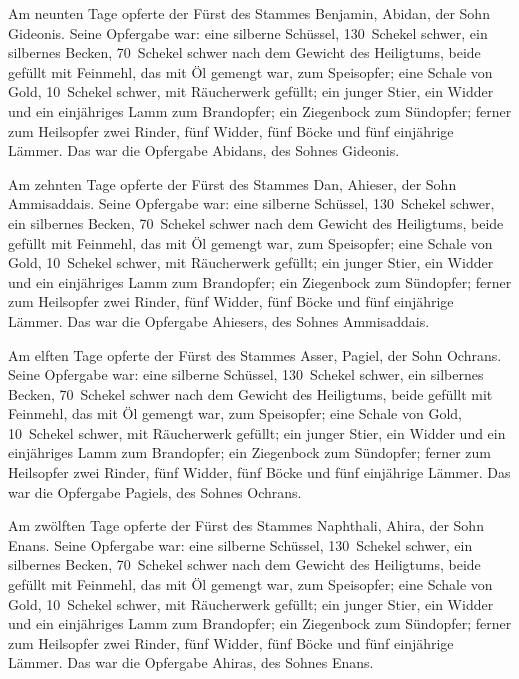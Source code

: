 Am neunten Tage opferte der Fürst des Stammes Benjamin,
Abidan, der Sohn Gideonis. Seine Opfergabe war: eine
silberne Schüssel, 130~Schekel schwer, ein silbernes Becken, 70~Schekel
schwer nach dem Gewicht des Heiligtums, beide gefüllt mit Feinmehl, das
mit Öl gemengt war, zum Speisopfer; eine Schale von Gold,
10~Schekel schwer, mit Räucherwerk gefüllt; ein junger
Stier, ein Widder und ein einjähriges Lamm zum Brandopfer;
ein Ziegenbock zum Sündopfer; ferner zum
Heilsopfer zwei Rinder, fünf Widder, fünf Böcke und fünf einjährige
Lämmer. Das war die Opfergabe Abidans, des Sohnes Gideonis.

Am zehnten Tage opferte der Fürst des Stammes Dan,
Ahieser, der Sohn Ammisaddais. Seine Opfergabe war: eine
silberne Schüssel, 130~Schekel schwer, ein silbernes Becken, 70~Schekel
schwer nach dem Gewicht des Heiligtums, beide gefüllt mit Feinmehl, das
mit Öl gemengt war, zum Speisopfer; eine Schale von Gold,
10~Schekel schwer, mit Räucherwerk gefüllt; ein junger
Stier, ein Widder und ein einjähriges Lamm zum Brandopfer;
ein Ziegenbock zum Sündopfer; ferner zum
Heilsopfer zwei Rinder, fünf Widder, fünf Böcke und fünf einjährige
Lämmer. Das war die Opfergabe Ahiesers, des Sohnes Ammisaddais.

Am elften Tage opferte der Fürst des Stammes Asser,
Pagiel, der Sohn Ochrans. Seine Opfergabe war: eine
silberne Schüssel, 130~Schekel schwer, ein silbernes Becken, 70~Schekel
schwer nach dem Gewicht des Heiligtums, beide gefüllt mit Feinmehl, das
mit Öl gemengt war, zum Speisopfer; eine Schale von Gold,
10~Schekel schwer, mit Räucherwerk gefüllt; ein junger
Stier, ein Widder und ein einjähriges Lamm zum Brandopfer;
ein Ziegenbock zum Sündopfer; ferner zum
Heilsopfer zwei Rinder, fünf Widder, fünf Böcke und fünf einjährige
Lämmer. Das war die Opfergabe Pagiels, des Sohnes Ochrans.

Am zwölften Tage opferte der Fürst des Stammes Naphthali,
Ahira, der Sohn Enans. Seine Opfergabe war: eine silberne
Schüssel, 130~Schekel schwer, ein silbernes Becken, 70~Schekel schwer
nach dem Gewicht des Heiligtums, beide gefüllt mit Feinmehl, das mit Öl
gemengt war, zum Speisopfer; eine Schale von Gold,
10~Schekel schwer, mit Räucherwerk gefüllt; ein junger
Stier, ein Widder und ein einjähriges Lamm zum Brandopfer;
ein Ziegenbock zum Sündopfer; ferner zum
Heilsopfer zwei Rinder, fünf Widder, fünf Böcke und fünf einjährige
Lämmer. Das war die Opfergabe Ahiras, des Sohnes Enans.

